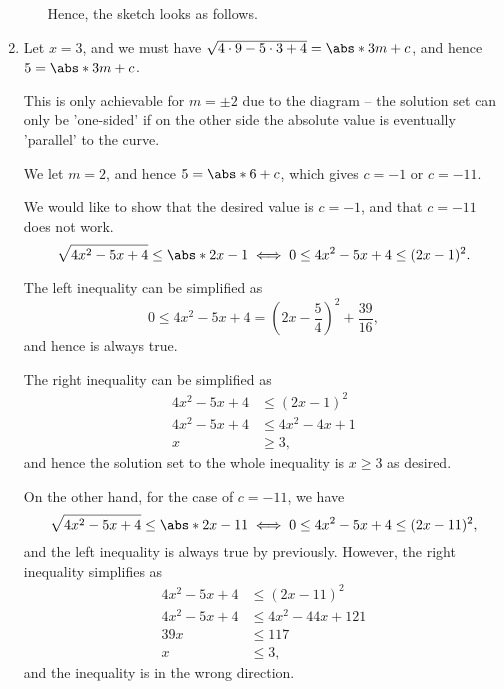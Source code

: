 \begin{enumerate}
\begin{enumerate}
                    Hence, the sketch looks as follows.

                    \begin{center}
                        
                    \end{center}
          \end{enumerate}

    \item Let \(x = 3\), and we must have \(\sqrt{4 \cdot 9 - 5 \cdot 3 + 4} = \abs*{3m + c}\), and hence \(5 = \abs*{3m + c}\).

          This is only achievable for \(m = \pm 2\) due to the diagram -- the solution set can only be 'one-sided' if on the other side the absolute value is eventually 'parallel' to the curve.

          We let \(m = 2\), and hence \(5 = \abs*{6 + c}\), which gives \(c = -1\) or \(c = -11\).

          We would like to show that the desired value is \(c = -1\), and that \(c = -11\) does not work.
          \[
              \sqrt{4x^2 - 5x + 4} \leq \abs*{2x - 1} \iff 0 \leq 4x^2 - 5x + 4 \leq (2x - 1)^2.
          \]

          The left inequality can be simplified as
          \[
              0 \leq 4x^2 - 5x + 4 = \left(2x - \frac{5}{4}\right)^2 + \frac{39}{16},
          \]
          and hence is always true.

          The right inequality can be simplified as
          \begin{align*}
              4x^2 - 5x + 4 & \leq (2x - 1)^2    \\
              4x^2 - 5x + 4 & \leq 4x^2 - 4x + 1 \\
              x             & \geq 3,
          \end{align*}
          and hence the solution set to the whole inequality is \(x \geq 3\) as desired.

          On the other hand, for the case of \(c = -11\), we have
          \[
              \sqrt{4x^2 - 5x + 4} \leq \abs*{2x - 11} \iff 0 \leq 4x^2 - 5x + 4 \leq (2x - 11)^2,
          \]
          and the left inequality is always true by previously. However, the right inequality simplifies as
          \begin{align*}
              4x^2 - 5x + 4 & \leq (2x - 11)^2      \\
              4x^2 - 5x + 4 & \leq 4x^2 - 44x + 121 \\
              39x           & \leq 117              \\
              x             & \leq 3,
          \end{align*}
          and the inequality is in the wrong direction.


\end{enumerate}
